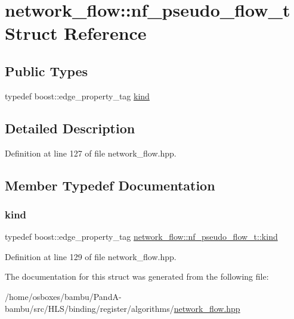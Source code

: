 \hypertarget{structnetwork__flow_1_1nf__pseudo__flow__t}{}\section{network\+\_\+flow\+:\+:nf\+\_\+pseudo\+\_\+flow\+\_\+t Struct Reference}
\label{structnetwork__flow_1_1nf__pseudo__flow__t}
\subsection*{Public Types}
\begin{DoxyCompactItemize}
\item 
typedef boost\+::edge\+\_\+property\+\_\+tag \hyperlink{structnetwork__flow_1_1nf__pseudo__flow__t_a7862afa5b08146d90042a9dccd4c7952}{kind}
\end{DoxyCompactItemize}


\subsection{Detailed Description}


Definition at line 127 of file network\+\_\+flow.\+hpp.



\subsection{Member Typedef Documentation}
\mbox{\label{structnetwork__flow_1_1nf__pseudo__flow__t_a7862afa5b08146d90042a9dccd4c7952}} 
\subsubsection{\texorpdfstring{kind}{kind}}
{\footnotesize\ttfamily typedef boost\+::edge\+\_\+property\+\_\+tag \hyperlink{structnetwork__flow_1_1nf__pseudo__flow__t_a7862afa5b08146d90042a9dccd4c7952}{network\+\_\+flow\+::nf\+\_\+pseudo\+\_\+flow\+\_\+t\+::kind}}



Definition at line 129 of file network\+\_\+flow.\+hpp.



The documentation for this struct was generated from the following file\+:\begin{DoxyCompactItemize}
\item 
/home/osboxes/bambu/\+Pand\+A-\/bambu/src/\+H\+L\+S/binding/register/algorithms/\hyperlink{network__flow_8hpp}{network\+\_\+flow.\+hpp}\end{DoxyCompactItemize}
